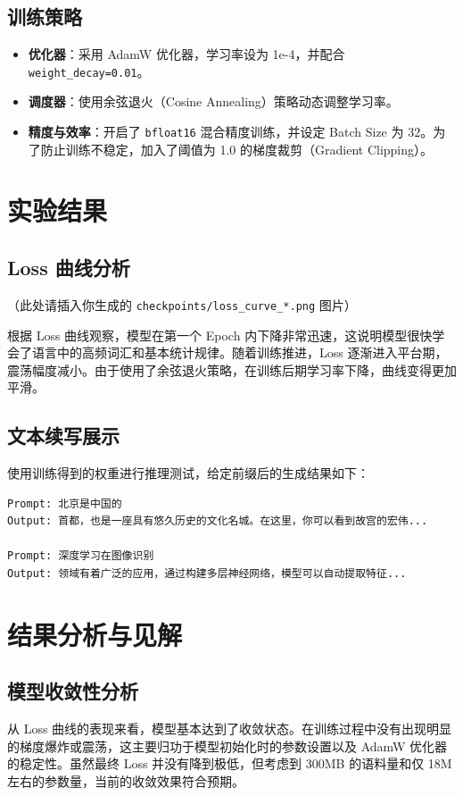 \documentclass[a4paper,12pt]{ctexart} %
\begin{document}
\subsection{训练策略}
\begin{itemize}
    \item \textbf{优化器}：采用 AdamW 优化器，学习率设为 1e-4，并配合 \texttt{weight\_decay=0.01}。
    \item \textbf{调度器}：使用余弦退火（Cosine Annealing）策略动态调整学习率。
    \item \textbf{精度与效率}：开启了 \texttt{bfloat16} 混合精度训练，并设定 Batch Size 为 32。为了防止训练不稳定，加入了阈值为 1.0 的梯度裁剪（Gradient Clipping）。
\end{itemize}

\section{实验结果}

\subsection{Loss 曲线分析}
（此处请插入你生成的 \texttt{checkpoints/loss\_curve\_*.png} 图片）

根据 Loss 曲线观察，模型在第一个 Epoch 内下降非常迅速，这说明模型很快学会了语言中的高频词汇和基本统计规律。随着训练推进，Loss 逐渐进入平台期，震荡幅度减小。由于使用了余弦退火策略，在训练后期学习率下降，曲线变得更加平滑。

\subsection{文本续写展示}
使用训练得到的权重进行推理测试，给定前缀后的生成结果如下：

\begin{lstlisting}[caption={推理生成示例}]
Prompt: 北京是中国的
Output: 首都，也是一座具有悠久历史的文化名城。在这里，你可以看到故宫的宏伟...

Prompt: 深度学习在图像识别
Output: 领域有着广泛的应用，通过构建多层神经网络，模型可以自动提取特征...
\end{lstlisting}

\section{结果分析与见解}

\subsection{模型收敛性分析}
从 Loss 曲线的表现来看，模型基本达到了收敛状态。在训练过程中没有出现明显的梯度爆炸或震荡，这主要归功于模型初始化时的参数设置以及 AdamW 优化器的稳定性。虽然最终 Loss 并没有降到极低，但考虑到 300MB 的语料量和仅 18M 左右的参数量，当前的收敛效果符合预期。
\end{document}
